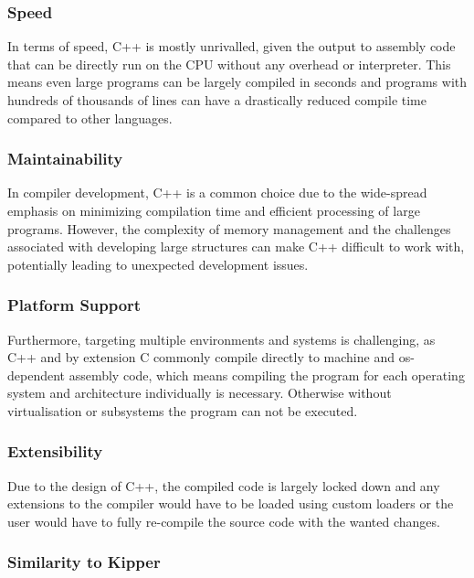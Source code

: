 \subsubsection{Speed}

In terms of speed, C++ is mostly unrivalled, given the output to assembly code that can be directly run on the CPU without any overhead or interpreter. This means even large programs can be largely compiled in seconds and programs with hundreds of thousands of lines can have a drastically reduced compile time compared to other languages.

\subsubsection{Maintainability}

In compiler development, C++ is a common choice due to the wide-spread emphasis on minimizing compilation time and efficient processing of large programs. However, the complexity of memory management and the challenges associated with developing large structures can make C++ difficult to work with, potentially leading to unexpected development issues.

\subsubsection{Platform Support}

Furthermore, targeting multiple environments and systems is challenging, as C++ and by extension C commonly compile directly to machine and os-dependent assembly code, which means compiling the program for each operating system and architecture individually is necessary. Otherwise without virtualisation or subsystems the program can not be executed.

\subsubsection{Extensibility}

Due to the design of C++, the compiled code is largely locked down and any extensions to the compiler would have to be loaded using custom loaders or the user would have to fully re-compile the source code with the wanted changes.

\subsubsection{Similarity to Kipper}

